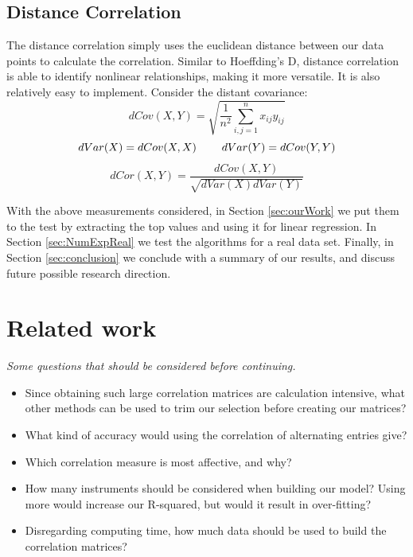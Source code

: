 \documentclass[10pt]{siamltex}
\begin{document}
\subsection{Distance Correlation}

The distance correlation simply uses the euclidean distance between our data points to calculate the correlation\cite{CorDist}. Similar to Hoeffding's D, distance correlation is able to identify nonlinear relationships, making it more versatile. It is also relatively easy to implement. Consider the distant covariance:
\begin{equation}
dCov(X,Y) = \sqrt{\frac{1}{n^2}\sum_{i,j=1}^nx_{ij}y_{ij}}
\end{equation}
\begin{equation}
dVar(X) = dCov(X,X) \hspace{8mm} dVar(Y) = dCov(Y,Y)
\end{equation}
\begin{equation}
dCor(X,Y) = \frac{dCov(X,Y)}{\sqrt{dVar(X)dVar(Y)}}
\end{equation}

With the above measurements considered, in Section \ref{sec:ourWork} we put them to the test by extracting the top values and using it for linear regression. 
In Section \ref{sec:NumExpReal} we test the algorithms for a real data set. Finally, in Section  \ref{sec:conclusion} we conclude with a summary of our results, and discuss future possible research direction. 

\vspace{5mm}

\section{Related work} \label{sec:relWork}

\begin{center}
	\textit{Some questions that should be considered before continuing.}
\end{center}

\vspace{2mm}

\begin{itemize}
\item Since obtaining such large correlation matrices are calculation intensive, what other methods can be used to trim our selection before creating our matrices?
\item What kind of accuracy would using the correlation of alternating entries give? 
\item Which correlation measure is most affective, and why?
\item How many instruments should be considered when building our model? Using more would increase our R-squared, but would it result in over-fitting?
\item Disregarding computing time, how much data should be used to build the correlation matrices?
\end{itemize}
\end{document}
